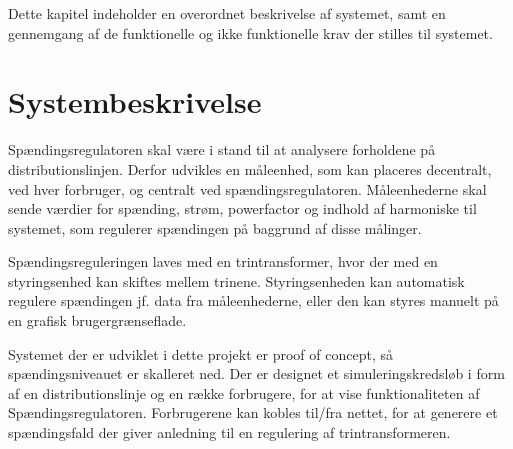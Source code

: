 
Dette kapitel indeholder en overordnet beskrivelse af systemet, samt en gennemgang af de funktionelle og ikke funktionelle krav der stilles til systemet. 

\section{Systembeskrivelse}
Spændingsregulatoren skal være i stand til at analysere forholdene på distributionslinjen. Derfor udvikles en måleenhed, som kan placeres decentralt, ved hver forbruger, og centralt ved spændingsregulatoren. Måleenhederne skal sende værdier for spænding, strøm, powerfactor og indhold af harmoniske til systemet, som regulerer spændingen på baggrund af disse målinger. 

Spændingsreguleringen laves med en trintransformer, hvor der med en styringsenhed kan skiftes mellem trinene. Styringsenheden kan automatisk regulere spændingen jf. data fra måleenhederne, eller den kan styres manuelt på en grafisk brugergrænseflade. 

Systemet der er udviklet i dette projekt er proof of concept, så spændingsniveauet er skalleret ned.  Der er designet et simuleringskredsløb i form af en distributionslinje og en række forbrugere, for at vise funktionaliteten af Spændingsregulatoren. Forbrugerene  kan kobles til/fra nettet, for at generere et spændingsfald der giver anledning til en regulering af trintransformeren. 

